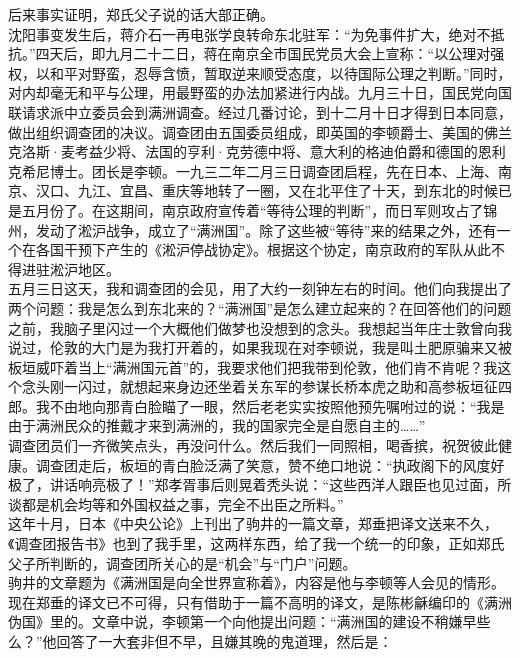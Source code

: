 后来事实证明，郑氏父子说的话大部正确。\\

沈阳事变发生后，蒋介石一再电张学良转命东北驻军：“为免事件扩大，绝对不抵抗。”四天后，即九月二十二日，蒋在南京全市国民党员大会上宣称：“以公理对强权，以和平对野蛮，忍辱含愤，暂取逆来顺受态度，以待国际公理之判断。”同时，对内却毫无和平与公理，用最野蛮的办法加紧进行内战。九月三十日，国民党向国联请求派中立委员会到满洲调查。经过几番讨论，到十二月十日才得到日本同意，做出组织调查团的决议。调查团由五国委员组成，即英国的李顿爵士、美国的佛兰克洛斯·麦考益少将、法国的亨利·克劳德中将、意大利的格迪伯爵和德国的恩利克希尼博士。团长是李顿。一九三二年二月三日调查团启程，先在日本、上海、南京、汉口、九江、宜昌、重庆等地转了一圈，又在北平住了十天，到东北的时候已是五月份了。在这期间，南京政府宣传着“等待公理的判断”，而日军则攻占了锦州，发动了淞沪战争，成立了“满洲国”。除了这些被“等待”来的结果之外，还有一个在各国干预下产生的《淞沪停战协定》。根据这个协定，南京政府的军队从此不得进驻淞沪地区。\\

五月三日这天，我和调查团的会见，用了大约一刻钟左右的时间。他们向我提出了两个问题：我是怎么到东北来的？“满洲国”是怎么建立起来的？在回答他们的问题之前，我脑子里闪过一个大概他们做梦也没想到的念头。我想起当年庄士敦曾向我说过，伦敦的大门是为我打开着的，如果我现在对李顿说，我是叫土肥原骗来又被板垣威吓着当上“满洲国元首”的，我要求他们把我带到伦敦，他们肯不肯呢？我这个念头刚一闪过，就想起来身边还坐着关东军的参谋长桥本虎之助和高参板垣征四郎。我不由地向那青白脸瞄了一眼，然后老老实实按照他预先嘱咐过的说：“我是由于满洲民众的推戴才来到满洲的，我的国家完全是自愿自主的……”\\

调查团员们一齐微笑点头，再没问什么。然后我们一同照相，喝香摈，祝贺彼此健康。调查团走后，板垣的青白脸泛满了笑意，赞不绝口地说：“执政阁下的风度好极了，讲话响亮极了！”郑孝胥事后则晃着秃头说：“这些西洋人跟臣也见过面，所谈都是机会均等和外国权益之事，完全不出臣之所料。”\\

这年十月，日本《中央公论》上刊出了驹井的一篇文章，郑垂把译文送来不久，《调查团报告书》也到了我手里，这两样东西，给了我一个统一的印象，正如郑氏父子所判断的，调查团所关心的是“机会”与“门户”问题。\\

驹井的文章题为《满洲国是向全世界宣称着》，内容是他与李顿等人会见的情形。现在郑垂的译文已不可得，只有借助于一篇不高明的译文，是陈彬龢编印的《满洲伪国》里的。文章中说，李顿第一个向他提出问题：“满洲国的建设不稍嫌早些么？”他回答了一大套非但不早，且嫌其晚的鬼道理，然后是：\\

